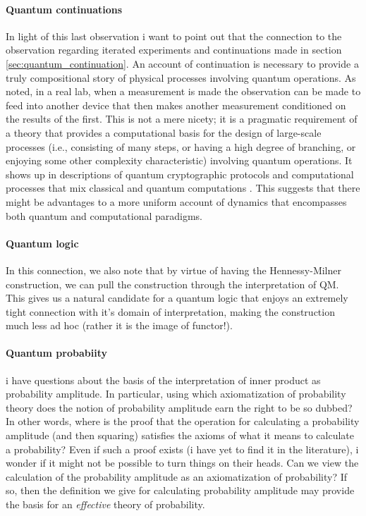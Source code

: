 \paragraph{Quantum continuations}
In light of this last observation i want to point out that the
connection to the observation regarding iterated experiments and
continuations made in section \ref{sec:quantum_continuation}. An
account of continuation is necessary to provide a truly compositional
story of physical processes involving quantum operations. As noted, in
a real lab, when a measurement is made the observation can be made to
feed into another device that then makes another measurement
conditioned on the results of the first. This is not a mere nicety; it
is a pragmatic requirement of a theory that provides a computational
basis for the design of large-scale processes (i.e., consisting of
many steps, or having a high degree of branching, or enjoying some
other complexity characteristic) involving quantum operations. It
shows up in descriptions of quantum cryptographic protocols
\cite{DBLP:conf/popl/GayN05} \cite{DBLP:conf/lics/AbramskyC04} and
computational processes that mix classical and quantum computations
\cite{DBLP:conf/tlca/SelingerV05}
\cite{DBLP:conf/flops/Selinger04}. This suggests that there might be
advantages to a more uniform account of dynamics that encompasses both
quantum and computational paradigms.

\paragraph{Quantum logic}
In this connection, we also note that by virtue of having the
Hennessy-Milner construction, we can pull the construction through the
interpretation of QM. This gives us a natural candidate for a quantum
logic that enjoys an extremely tight connection with it's domain of
interpretation, making the construction much less ad hoc (rather it is
the image of functor!).

\paragraph{Quantum probabiity}
i have questions about the basis of the interpretation of inner
product as probability amplitude. In particular, using which
axiomatization of probability theory does the notion of probability
amplitude earn the right to be so dubbed? In other words, where is the
proof that the operation for calculating a probability amplitude (and
then squaring) satisfies the axioms of what it means to calculate a
probability? Even if such a proof exists (i have yet to find it in the
literature), i wonder if it might not be possible to turn things on
their heads. Can we view the calculation of the probability amplitude
as an axiomatization of probability? If so, then the definition we
give for calculating probability amplitude may provide the basis for
an \emph{effective} theory of probability.


